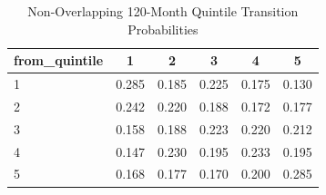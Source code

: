 \begin{table}
\caption{Non-Overlapping 120-Month Quintile Transition Probabilities}
\label{tab:quintile_transitions}
\begin{tabular}{lccccc}
\toprule
from_quintile & 1 & 2 & 3 & 4 & 5 \\
\midrule
1 & 0.285 & 0.185 & 0.225 & 0.175 & 0.130 \\
2 & 0.242 & 0.220 & 0.188 & 0.172 & 0.177 \\
3 & 0.158 & 0.188 & 0.223 & 0.220 & 0.212 \\
4 & 0.147 & 0.230 & 0.195 & 0.233 & 0.195 \\
5 & 0.168 & 0.177 & 0.170 & 0.200 & 0.285 \\
\bottomrule
\end{tabular}
\end{table}

